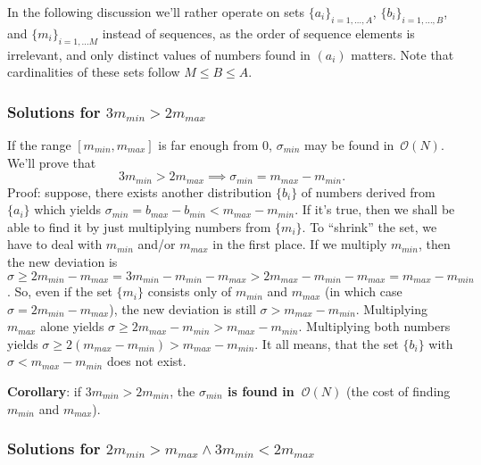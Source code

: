 \documentclass[paper=a4,parskip=half,DIV=12]{leetcode}
\begin{document}
In the following discussion we'll rather operate on sets $\{ a_i \}_{i =
1,\dots, A}$, $\{ b_i \}_{i = 1, \dots, B}$, and $\{ m_i \}_{i = 1, \dots M}$
instead of sequences, as the order of sequence elements is irrelevant, and only
distinct values of numbers found in $(a_i)$ matters. Note that cardinalities of
these sets follow $M \le B \le A$.

\subsubsection{Solutions for $3 m_{min} > 2 m_{max}$}
\label{sec:ZCP3Z}

If the range $[m_{min}, m_{max}]$ is far enough from $0$, $\sigma_{min}$ may be
found in~$\mathcal{O}(N)$. We'll prove that
\begin{equation}
  3 m_{min} > 2 m_{max} \implies \sigma_{min} = m_{max} - m_{min}.
  \label{eq:FX72R}
\end{equation}
Proof: suppose, there exists another distribution $\{b_i\}$ of numbers derived
from $\{a_i\}$ which yields $\sigma_{min} = b_{max} - b_{min} < m_{max} -
m_{min}$. If it's true, then we shall be able to find it by just multiplying
numbers from $\{m_i\}$. To ``shrink'' the set, we have to deal with $m_{min}$
and/or $m_{max}$ in the first place. If we multiply $m_{min}$, then the new
deviation is $\sigma \ge 2 m_{min} - m_{max} = 3 m_{min} - m_{min} - m_{max} > 2
m_{max} - m_{min} - m_{max} = m_{max} - m_{min}$. So, even if the set $\{m_i\}$
consists only of $m_{min}$ and $m_{max}$ (in which case $\sigma = 2 m_{min} -
m_{max}$), the new deviation is still $\sigma > m_{max} - m_{min}$. Multiplying
$m_{max}$ alone yields $\sigma \ge 2 m_{max} - m_{min} > m_{max} - m_{min}$.
Multiplying both numbers yields $\sigma \ge 2 (m_{max} - m_{min}) > m_{max} -
m_{min}$. It all means, that the set $\{b_i\}$ with $\sigma < m_{max} - m_{min}$
does not exist.

\textbf{Corollary}: if $3 m_{min} > 2 m_{min}$, the \textbf{$\sigma_{min}$ is
found in~$\mathcal{O}(N)$} (the cost of finding $m_{min}$ and $m_{max}$).

\subsubsection{Solutions for $2 m_{min} > m_{max} \wedge 3 m_{min} < 2 m_{max}$}
\label{sec:6GNBB}
\end{document}
